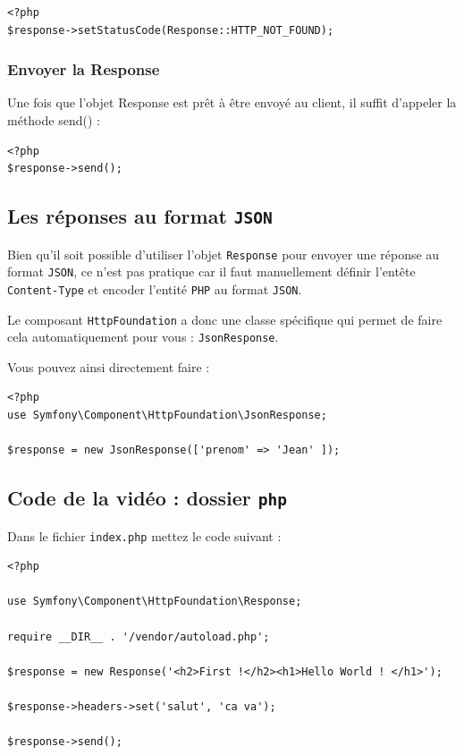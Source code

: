 \documentclass{article}
\begin{document}
\begin{verbatim}
<?php
$response->setStatusCode(Response::HTTP_NOT_FOUND);
\end{verbatim} 

\subsubsection{Envoyer la Response}
Une fois que l'objet Response est prêt à être envoyé au client, il suffit d'appeler la méthode send() :

\begin{verbatim}
<?php
$response->send();
\end{verbatim} 

\subsection{Les réponses au format {\tt JSON}}
Bien qu'il soit possible d'utiliser l'objet {\tt Response} pour envoyer une réponse au format {\tt JSON}, ce n'est pas pratique car il faut manuellement définir l'entête {\tt Content-Type} et encoder l'entité {\tt PHP} au format {\tt JSON}.

Le composant {\tt HttpFoundation} a donc une classe spécifique qui permet de faire cela automatiquement pour vous : {\tt JsonResponse}.

Vous pouvez ainsi directement faire :
\begin{verbatim}
<?php
use Symfony\Component\HttpFoundation\JsonResponse;

$response = new JsonResponse(['prenom' => 'Jean' ]);
\end{verbatim} 

\subsection{Code de la vidéo : dossier {\tt php}}
Dans le fichier {\tt index.php} mettez le code suivant :

\begin{verbatim}
<?php

use Symfony\Component\HttpFoundation\Response;

require __DIR__ . '/vendor/autoload.php';

$response = new Response('<h2>First !</h2><h1>Hello World ! </h1>');

$response->headers->set('salut', 'ca va');

$response->send();
\end{verbatim} 
\end{document}
